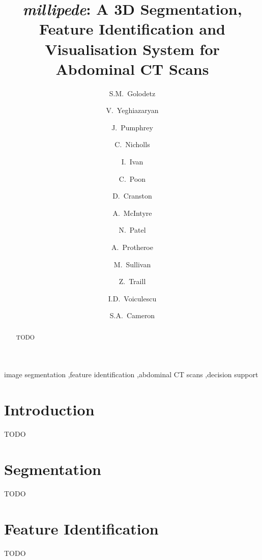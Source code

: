 \documentclass[preprint,a4paper]{elsarticle}
\begin{document}
\begin{frontmatter}

\title{\emph{millipede}: A 3D Segmentation, Feature Identification and Visualisation System for Abdominal CT Scans}

\author[ox]{S.M.~Golodetz}

\author[ox]{V.~Yeghiazaryan}
\author[ox]{J.~Pumphrey}
\author[ox]{C.~Nicholls}
\author[ox]{I.~Ivan}
\author[ox]{C.~Poon}
\author[ch]{D.~Cranston}
\author[ch]{A.~McIntyre}
\author[ch]{N.~Patel}
\author[ch]{A.~Protheroe}
\author[ch]{M.~Sullivan}
\author[ch]{Z.~Traill}

\author[ox]{I.D.~Voiculescu}

\author[ox]{S.A.~Cameron}


\address[ox]{Department of Computer Science, University of Oxford, Parks Road, Oxford OX1 3QD}
\address[ch]{Churchill Hospital, Old Road, Headington, Oxford OX3 7LE}

\begin{abstract}
TODO
\end{abstract}

\begin{keyword}
image segmentation \sep feature identification \sep abdominal CT scans \sep decision support
\end{keyword}

\end{frontmatter}

\section{Introduction}

TODO

\nocite{gvcfbit07,gvchsi09}

\section{Segmentation}

TODO

\section{Feature Identification}

TODO
\end{document}
